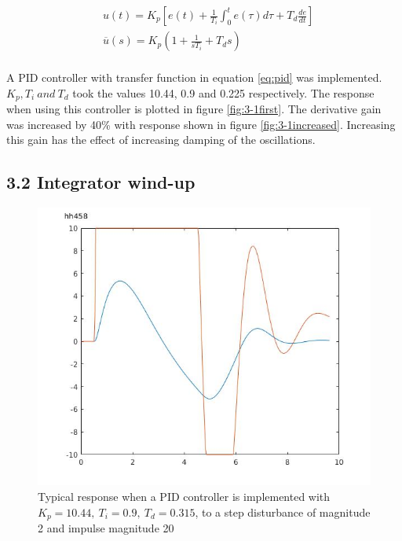 \documentclass[twoside,twocolumn]{article}
\begin{document}
\begin{equation}
\label{eq:pid}
\begin{split}
&u(t) = K_p[e(t) + \frac{1}{T_i}\int_0^te(\tau)d\tau+T_d\frac{de}{dt}]\\
&\overline{u}(s)=K_p(1+\frac{1}{sT_i}+T_ds)\\
\end{split}
\end{equation}

A PID controller with transfer function in equation \ref{eq:pid} was implemented. $K_p,T_i \: and \: T_d$ took the values 10.44, 0.9 and 0.225 respectively. The response when using this controller is plotted in figure \ref{fig:3-1first}. The derivative gain was increased by 40\% with response shown in figure \ref{fig:3-1increased}. Increasing this gain has the effect of increasing damping of the oscillations.
\subsection{3.2 Integrator wind-up}
\begin{figure}[h]
  \centering
    \includegraphics[width=\linewidth]{3-2_first_go}
  \caption{Typical response when a PID controller is implemented with $K_p = 10.44,\:T_i=0.9,\:T_d=0.315$, to a step disturbance of magnitude 2 and impulse magnitude 20}
  \label{fig:3-2first}
\end{figure}
\end{document}
